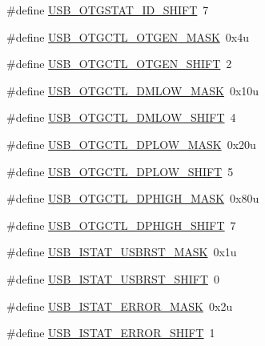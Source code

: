 \begin{DoxyCompactItemize}
\item 
\#define \hyperlink{group___u_s_b___register___masks_ga4f674a8a6d13daeb25950cb78cfa625c}{U\+S\+B\+\_\+\+O\+T\+G\+S\+T\+A\+T\+\_\+\+I\+D\+\_\+\+S\+H\+I\+FT}~7
\item 
\#define \hyperlink{group___u_s_b___register___masks_ga6cdb9b59615dfc774914e37d44f17e3a}{U\+S\+B\+\_\+\+O\+T\+G\+C\+T\+L\+\_\+\+O\+T\+G\+E\+N\+\_\+\+M\+A\+SK}~0x4u
\item 
\#define \hyperlink{group___u_s_b___register___masks_ga45ccee22440e024d6e6096d5607372f6}{U\+S\+B\+\_\+\+O\+T\+G\+C\+T\+L\+\_\+\+O\+T\+G\+E\+N\+\_\+\+S\+H\+I\+FT}~2
\item 
\#define \hyperlink{group___u_s_b___register___masks_ga929467feea7b1506c205dd78112a8a98}{U\+S\+B\+\_\+\+O\+T\+G\+C\+T\+L\+\_\+\+D\+M\+L\+O\+W\+\_\+\+M\+A\+SK}~0x10u
\item 
\#define \hyperlink{group___u_s_b___register___masks_ga11854093d47631b4f11f0c50bf7a063f}{U\+S\+B\+\_\+\+O\+T\+G\+C\+T\+L\+\_\+\+D\+M\+L\+O\+W\+\_\+\+S\+H\+I\+FT}~4
\item 
\#define \hyperlink{group___u_s_b___register___masks_gad6a988a0338aa5fcd511f9644b2375eb}{U\+S\+B\+\_\+\+O\+T\+G\+C\+T\+L\+\_\+\+D\+P\+L\+O\+W\+\_\+\+M\+A\+SK}~0x20u
\item 
\#define \hyperlink{group___u_s_b___register___masks_ga94318731712f5399af57fefe46ac8cec}{U\+S\+B\+\_\+\+O\+T\+G\+C\+T\+L\+\_\+\+D\+P\+L\+O\+W\+\_\+\+S\+H\+I\+FT}~5
\item 
\#define \hyperlink{group___u_s_b___register___masks_ga58ba9522df4e9a18c7efa0472837c30c}{U\+S\+B\+\_\+\+O\+T\+G\+C\+T\+L\+\_\+\+D\+P\+H\+I\+G\+H\+\_\+\+M\+A\+SK}~0x80u
\item 
\#define \hyperlink{group___u_s_b___register___masks_ga898efaea515cbbb64826b7685082665f}{U\+S\+B\+\_\+\+O\+T\+G\+C\+T\+L\+\_\+\+D\+P\+H\+I\+G\+H\+\_\+\+S\+H\+I\+FT}~7
\item 
\#define \hyperlink{group___u_s_b___register___masks_gaacafc35a1c208555b284f9f086708686}{U\+S\+B\+\_\+\+I\+S\+T\+A\+T\+\_\+\+U\+S\+B\+R\+S\+T\+\_\+\+M\+A\+SK}~0x1u
\item 
\#define \hyperlink{group___u_s_b___register___masks_gad463e743b6bdd9589a499bf654703da0}{U\+S\+B\+\_\+\+I\+S\+T\+A\+T\+\_\+\+U\+S\+B\+R\+S\+T\+\_\+\+S\+H\+I\+FT}~0
\item 
\#define \hyperlink{group___u_s_b___register___masks_gaef490eac989ee78a88372bcbf3b029c6}{U\+S\+B\+\_\+\+I\+S\+T\+A\+T\+\_\+\+E\+R\+R\+O\+R\+\_\+\+M\+A\+SK}~0x2u
\item 
\#define \hyperlink{group___u_s_b___register___masks_gaa4afff6c8a78b6b44f3e314dd4746892}{U\+S\+B\+\_\+\+I\+S\+T\+A\+T\+\_\+\+E\+R\+R\+O\+R\+\_\+\+S\+H\+I\+FT}~1

\end{DoxyCompactItemize}

